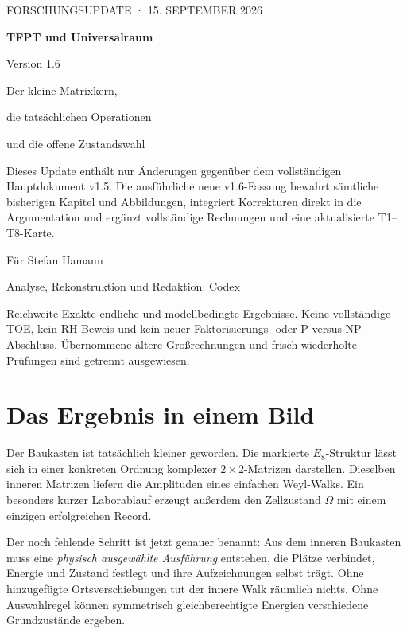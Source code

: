 \begin{titlepage}
\vspace*{15mm}
{\sffamily\color{teal}\large FORSCHUNGSUPDATE · 15. SEPTEMBER 2026\par}
\vspace{16mm}
{\sffamily\bfseries\color{navy}\fontsize{29}{35}\selectfont TFPT und Universalraum\par}
\vspace{8mm}
{\sffamily\color{navy}\LARGE Version 1.6\par}
\vspace{12mm}
{\sffamily\Large Der kleine Matrixkern,\par die tatsächlichen Operationen\par und die offene Zustandswahl\par}
\vspace{16mm}
Dieses Update enthält nur Änderungen gegenüber dem vollständigen Hauptdokument v1.5. Die ausführliche neue v1.6-Fassung bewahrt sämtliche bisherigen Kapitel und Abbildungen, integriert Korrekturen direkt in die Argumentation und ergänzt vollständige Rechnungen und eine aktualisierte T1--T8-Karte.
\vfill
{\sffamily Für Stefan Hamann\par Analyse, Rekonstruktion und Redaktion: Codex\par}
\vspace{8mm}
\begin{grenze}{Reichweite}
Exakte endliche und modellbedingte Ergebnisse. Keine vollständige TOE, kein RH-Beweis und kein neuer Faktorisierungs- oder P-versus-NP-Abschluss. Übernommene ältere Großrechnungen und frisch wiederholte Prüfungen sind getrennt ausgewiesen.
\end{grenze}
\end{titlepage}

\chapter*{Das Ergebnis in einem Bild}
Der Baukasten ist tatsächlich kleiner geworden. Die markierte $E_8$-Struktur lässt sich in einer konkreten Ordnung komplexer $2\times2$-Matrizen darstellen. Dieselben inneren Matrizen liefern die Amplituden eines einfachen Weyl-Walks. Ein besonders kurzer Laborablauf erzeugt außerdem den Zellzustand $\Omega$ mit einem einzigen erfolgreichen Record.

Der noch fehlende Schritt ist jetzt genauer benannt: Aus dem inneren Baukasten muss eine \emph{physisch ausgewählte Ausführung} entstehen, die Plätze verbindet, Energie und Zustand festlegt und ihre Aufzeichnungen selbst trägt. Ohne hinzugefügte Ortsverschiebungen tut der innere Walk räumlich nichts. Ohne Auswahlregel können symmetrisch gleichberechtigte Energien verschiedene Grundzustände ergeben.

